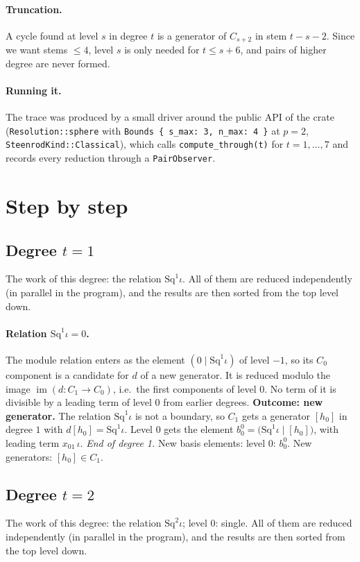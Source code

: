 \documentclass[11pt]{article}
\newcommand{\Sq}{\mathrm{Sq}}
\begin{document}
\paragraph{Truncation.}
A cycle found at level $s$ in degree $t$ is a generator of $C_{s+2}$ in stem $t-s-2$. Since we
want stems $\le 4$, level $s$ is only needed for $t \le s + 6$, and pairs of higher degree are
never formed.

\paragraph{Running it.}\sloppy
The trace was produced by a small driver around the public API of the crate
(\texttt{Resolution::sphere} with \texttt{Bounds \{ s\_max: 3, n\_max: 4 \}} at $p = 2$,
\texttt{SteenrodKind::Classical}), which calls \texttt{compute\_through(t)} for $t = 1, \dots, 7$
and records every reduction through a \texttt{PairObserver}.

\section{Step by step}

\subsection*{Degree $t = 1$}
\noindent The work of this degree: the relation $\Sq^{1}\iota$. All of them are reduced independently (in parallel in the program), and the results are then sorted from the top level down.
\medskip
\paragraph{Relation $\Sq^{1}\iota = 0$.} The module relation enters as the element $(0 \mid \Sq^{1}\iota)$ of level $-1$, so its $C_0$ component is a candidate for $d$ of a new generator. It is reduced modulo the image $\operatorname{im}(d\colon C_1\to C_0)$, i.e.\ the first components of level $0$.
No term of it is divisible by a leading term of level $0$ from earlier degrees.
\textbf{Outcome: new generator.} The relation $\Sq^{1}\iota$ is not a boundary, so $C_{1}$ gets a generator $[h_0]$ in degree $1$ with $d[h_0] = \Sq^{1}\iota$.
Level $0$ gets the element $b^{0}_{0} = \bigl(\Sq^{1}\iota \;\big|\; [h_0]\bigr)$, with leading term $x_{01}\,\iota$.
\medskip\noindent\emph{End of degree 1.} New basis elements: level $0$: $b^{0}_{0}$. New generators: $[h_0]\in C_{1}$.
\subsection*{Degree $t = 2$}
\noindent The work of this degree: the relation $\Sq^{2}\iota$; level $0$: single. All of them are reduced independently (in parallel in the program), and the results are then sorted from the top level down.
\medskip
\end{document}
